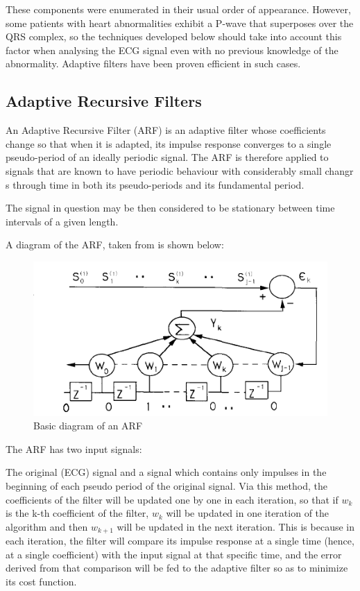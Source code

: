 \documentclass[conference]{IEEEtran}
\begin{document}
These components were enumerated in their usual order of appearance. However, some patients with heart abnormalities exhibit a P-wave that superposes over the QRS complex, so the techniques developed below should take into account this factor when analysing the ECG signal even with no previous knowledge of the abnormality. Adaptive filters have been proven efficient in such cases. \par

\subsection{Adaptive Recursive Filters}

An Adaptive Recursive Filter (ARF) is an adaptive filter whose coefficients change so that when it is adapted, its impulse response converges to a single pseudo-period of an ideally periodic signal. The ARF is therefore applied to signals that are known to have periodic behaviour with considerably small changr
s through time in both its pseudo-periods and its fundamental period.\par
The signal in question may be then considered to be stationary between time intervals of a given length.\par
A diagram of the ARF, taken from \cite{b1} is shown below:

\begin{figure}[H]
\centerline{\includegraphics[scale=0.7]{ARF_diagram.png}}
\caption{Basic diagram of an ARF}
\label{fig}
\end{figure}

The ARF has two input signals: \par
The original (ECG) signal and a signal which contains only impulses in the beginning of each pseudo period of the original signal. Via this method, the coefficients of the filter will be updated one by one in each iteration, so that if $w_k$ is the k-th coefficient of the filter, $w_k$ will be updated in one iteration of the algorithm and then  $w_{k+1}$ will be updated in the next iteration. This is because in each iteration, the filter will compare its impulse response at a single time (hence, at a single coefficient) with the input signal at that specific time, and the error derived from that comparison will be fed to the adaptive filter so as to minimize its cost function.
\end{document}
